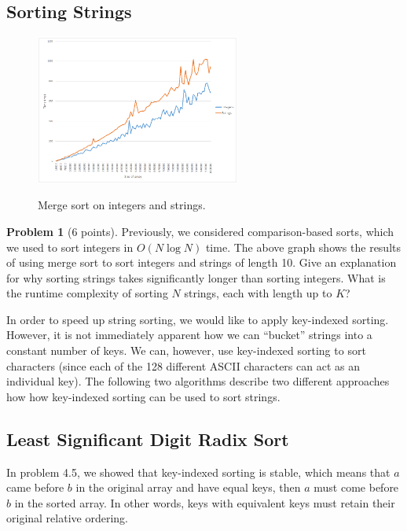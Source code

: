 \documentclass{exam}
\theoremstyle{definition}
\newtheorem{problem}{Problem}[section]
\theoremstyle{definition}
\begin{document}
\subsection{Sorting Strings}


\begin{figure}[h]
\begin{center}
\includegraphics[width=0.6\textwidth]{chart1.png} \\
\label{fig:mergesort}
\caption{Merge sort on integers and strings. }
\end{center}
\end{figure}


\begin{problem}[6 points]
    Previously, we considered comparison-based sorts, which we used to sort integers in $ O(N \log N) $ time.
    The above graph shows the results of using merge sort to sort integers and strings of length 10.
    Give an explanation for why sorting strings takes significantly longer than sorting integers. What is the runtime complexity of sorting $N$ strings, each with length up to $K$?
\end{problem}

In order to speed up string sorting, we would like to apply key-indexed sorting. However, it is not immediately apparent how we can ``bucket'' strings into a constant number of keys. We can, however, use key-indexed sorting to sort characters (since each of the 128 different ASCII characters can act as an individual key). The following two algorithms describe two different approaches how how key-indexed sorting can be used to sort strings. 



\subsection{Least Significant Digit Radix Sort}

In problem 4.5, we showed that key-indexed sorting is stable, which means that $a$ came before $b$ in the original array and have equal keys, then $a$ must come before $b$ in the sorted array. In other words, keys with equivalent keys must retain their original relative ordering. 
\end{document}
